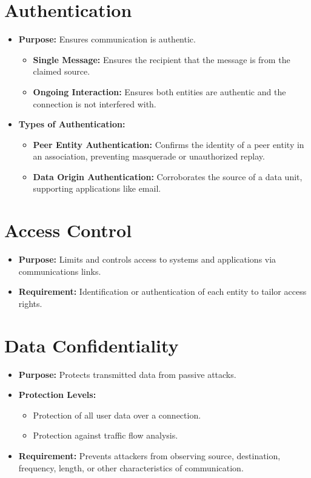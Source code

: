 \section{Authentication}
\begin{itemize}
    \item \textbf{Purpose:} Ensures communication is authentic.
    \begin{itemize}
        \item \textbf{Single Message:} Ensures the recipient that the message is from the claimed source.
        \item \textbf{Ongoing Interaction:} Ensures both entities are authentic and the connection is not interfered with.
    \end{itemize}
    \item \textbf{Types of Authentication:}
    \begin{itemize}
        \item \textbf{Peer Entity Authentication:} Confirms the identity of a peer entity in an association, preventing masquerade or unauthorized replay.
        \item \textbf{Data Origin Authentication:} Corroborates the source of a data unit, supporting applications like email.
    \end{itemize}
\end{itemize}

\section{Access Control}
\begin{itemize}
    \item \textbf{Purpose:} Limits and controls access to systems and applications via communications links.
    \item \textbf{Requirement:} Identification or authentication of each entity to tailor access rights.
\end{itemize}

\section{Data Confidentiality}
\begin{itemize}
    \item \textbf{Purpose:} Protects transmitted data from passive attacks.
    \item \textbf{Protection Levels:}
    \begin{itemize}
        \item Protection of all user data over a connection.
        \item Protection against traffic flow analysis.
    \end{itemize}
    \item \textbf{Requirement:} Prevents attackers from observing source, destination, frequency, length, or other characteristics of communication.
\end{itemize}

